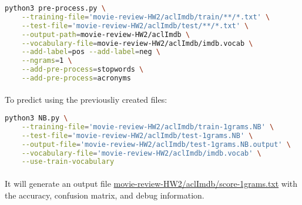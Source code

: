 \documentclass{article}
\begin{document}
\begin{lstlisting}[language=bash]
    python3 pre-process.py \
    --training-file='movie-review-HW2/aclImdb/train/**/*.txt' \
    --test-file='movie-review-HW2/aclImdb/test/**/*.txt' \
    --output-path=movie-review-HW2/aclImdb \
    --vocabulary-file=movie-review-HW2/aclImdb/imdb.vocab \
    --add-label=pos --add-label=neg \
    --ngrams=1 \
    --add-pre-process=stopwords \
    --add-pre-process=acronyms
\end{lstlisting}

\paragraph{} To predict using the previousliy created files:

\begin{lstlisting}[language=bash]
python3 NB.py \
    --training-file='movie-review-HW2/aclImdb/train-1grams.NB' \
    --test-file='movie-review-HW2/aclImdb/test-1grams.NB' \
    --output-file='movie-review-HW2/aclImdb/test-1grams.NB.output' \
    --vocabulary-file='movie-review-HW2/aclImdb/imdb.vocab' \
    --use-train-vocabulary
\end{lstlisting}

\paragraph{} It will generate an output file \url{movie-review-HW2/aclImdb/score-1grams.txt} with the accuracy, confusion matrix, and debug information.
\end{document}
